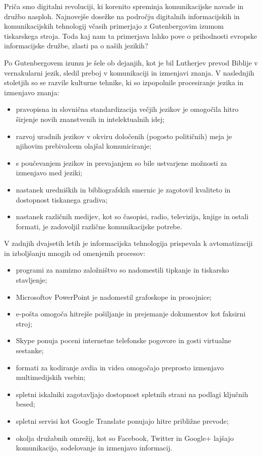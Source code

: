 \begin{multicols}{2}

Priča smo digitalni revoluciji, ki korenito spre\-minja komunikacijske navade in družbo nasploh.  Naj\-novejše dosežke na področju digitalnih informacij\-skih in komunikacijskih tehnologij včasih primerjajo z Gutenbergovim izumom tiskarskega stroja. Toda kaj nam ta primerjava lahko pove o prihodnosti evropske informacijske družbe, zlasti pa o naših jezikih?


Po Gutenbergovem izumu je šele ob dejanjih, kot je bil Lutherjev prevod Biblije v vernakularni jezik, sledil preboj v komunikaciji in izmenjavi znanja. V naslednjih stoletjih so se razvile kulturne tehnike, ki so izpopolnile procesiranje jezika in izmenjavo znanja:

\medskip
\begin{itemize}
\item pravopisna in slovnična standardizacija večjih jezikov je omogočila hitro širjenje novih znanstvenih in intelektualnih idej;
\item razvoj uradnih jezikov v okviru določenih (pogosto političnih) meja je njihovim prebivalcem olajšal komuniciranje;
\item s poučevanjem jezikov in prevajanjem so bile ustvarjene možnosti za izmenjavo med jeziki;
\item nastanek uredniških in bibliografskih smernic je zagotovil kvaliteto in dostopnost tiskanega gradiva;
\medskip
\item nastanek različnih medijev, kot so časopisi, radio, televizija, knjige in ostali formati, je zadovoljil različne komunikacijske potrebe.
\end{itemize}

V zadnjih dvajsetih letih je informacijska tehnologija prispevala k avtomatizaciji in izboljšanju mnogih od omenjenih procesov:

\begin{itemize}
\item programi za namizno založništvo so nadomestili tipkanje in tiskarsko stavljenje;
\item Microsoftov PowerPoint je nadomestil grafo\-skope in prosojnice;
\item e-pošta omogoča hitrejše pošiljanje in prejemanje dokumentov kot faksirni stroj;
\item Skype ponuja poceni internetne telefonske pogovore in gosti virtualne sestanke;
\item formati za kodiranje avdia in videa omogočajo preprosto izmenjavo multimedijskih vsebin;
\item spletni iskalniki zagotavljajo dostopnost spletnih strani na podlagi ključnih besed;
\item spletni servisi kot Google Translate ponujajo hitre približne prevode;
\item okolja družabnih omrežij, kot so Facebook, Twitter in Google+ lajšajo komunikacijo, sodelovanje in izmenjavo informacij.
\end{itemize}


\end{multicols}
